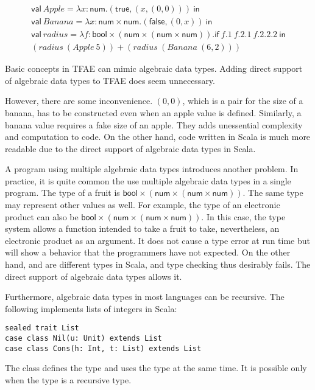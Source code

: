 \[
\begin{array}{l}
\textsf{val}\ Apple=\lambda x:\textsf{num}.(\textsf{true},(x,(0,0)))\ \textsf{in}
\\
\textsf{val}\ Banana=\lambda
x:\textsf{num}\times\textsf{num}.(\textsf{false},(0,x))\ \textsf{in} \\
\textsf{val}\ radius=\lambda
f:\textsf{bool}\times(\textsf{num}\times(\textsf{num}\times\textsf{num})).
\textsf{if}\ f.1\ f.2.1\ f.2.2.2\ \textsf{in} \\
(radius\ (Apple\ 5))+(radius\ (Banana\ (6,2)))
\end{array}
\]

Basic concepts in TFAE can mimic algebraic data types. Adding direct support of
algebraic data types to TFAE does seem unnecessary.

However, there are some inconvenience. $(0,0)$, which is a pair for the size
of a banana, has to be constructed even when an apple value is defined.
Similarly, a banana value requires a fake size of an apple. They adds
unessential complexity and computation to code. On the other hand, code written
in Scala is much more readable due to the direct support of algebraic data types
in Scala.

A program using multiple algebraic data types introduces another problem. In
practice, it is quite common the use multiple algebraic data types in a single
program. The type of a fruit is \(\textsf{bool}\times(\textsf{num}\times(\textsf{
num}\times\textsf{num}))\). The same type may represent other values as well. For
example, the type of an electronic product can also be
\(\textsf{bool}\times(\textsf{
num}\times(\textsf{num}\times\textsf{num}))\). In this case, the type system allows a
function intended to take a fruit to take, nevertheless, an electronic product
as an argument. It does not cause a type error at run time but will show a
behavior that the programmers have not expected. On the other hand, 
and
 are different types in Scala, and type checking thus desirably
fails. The direct support of algebraic data types allows it.

Furthermore, algebraic data types in most languages can be recursive. The
following implements lists of integers in Scala:

\begin{verbatim}
sealed trait List
case class Nil(u: Unit) extends List
case class Cons(h: Int, t: List) extends List
\end{verbatim}

The class  defines the type  and uses the type 
at the same
time. It is possible only when the type  is a recursive type.

